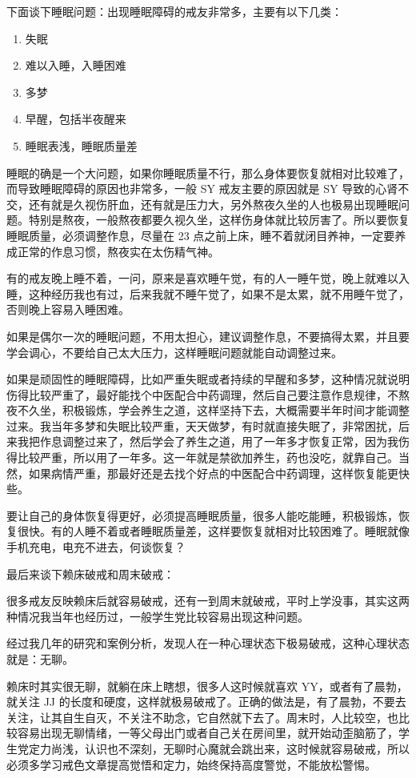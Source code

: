 \documentclass{ctexart}
\begin{document}
下面谈下睡眠问题：出现睡眠障碍的戒友非常多，主要有以下几类：

\begin{enumerate}
    \item 失眠
    \item 难以入睡，入睡困难
    \item 多梦
    \item 早醒，包括半夜醒来
    \item 睡眠表浅，睡眠质量差
\end{enumerate}

睡眠的确是一个大问题，如果你睡眠质量不行，那么身体要恢复就相对比较难了，而导致睡眠障碍的原因也非常多，一般 SY 戒友主要的原因就是 SY 导致的心肾不交，还有就是久视伤肝血，还有就是压力大，另外熬夜久坐的人也极易出现睡眠问题。特别是熬夜，一般熬夜都要久视久坐，这样伤身体就比较厉害了。所以要恢复睡眠质量，必须调整作息，尽量在 23 点之前上床，睡不着就闭目养神，一定要养成正常的作息习惯，熬夜实在太伤精气神。

有的戒友晚上睡不着，一问，原来是喜欢睡午觉，有的人一睡午觉，晚上就难以入睡，这种经历我也有过，后来我就不睡午觉了，如果不是太累，就不用睡午觉了，否则晚上容易入睡困难。

如果是偶尔一次的睡眠问题，不用太担心，建议调整作息，不要搞得太累，并且要学会调心，不要给自己太大压力，这样睡眠问题就能自动调整过来。

如果是顽固性的睡眠障碍，比如严重失眠或者持续的早醒和多梦，这种情况就说明伤得比较严重了，最好能找个中医配合中药调理，然后自己要注意作息规律，不熬夜不久坐，积极锻炼，学会养生之道，这样坚持下去，大概需要半年时间才能调整过来。我当年多梦和失眠比较严重，天天做梦，有时就直接失眠了，非常困扰，后来我把作息调整过来了，然后学会了养生之道，用了一年多才恢复正常，因为我伤得比较严重，所以用了一年多。这一年就是禁欲加养生，药也没吃，就靠自己。当然，如果病情严重，那最好还是去找个好点的中医配合中药调理，这样恢复能更快些。

要让自己的身体恢复得更好，必须提高睡眠质量，很多人能吃能睡，积极锻炼，恢复很快。有的人睡不着或者睡眠质量差，这样要恢复就相对比较困难了。睡眠就像手机充电，电充不进去，何谈恢复？

最后来谈下赖床破戒和周末破戒：

很多戒友反映赖床后就容易破戒，还有一到周末就破戒，平时上学没事，其实这两种情况我当年也经历过，一般学生党比较容易出现这种问题。

经过我几年的研究和案例分析，发现人在一种心理状态下极易破戒，这种心理状态就是：无聊。

赖床时其实很无聊，就躺在床上瞎想，很多人这时候就喜欢 YY，或者有了晨勃，就关注 JJ 的长度和硬度，这样就极易破戒了。正确的做法是，有了晨勃，不要去关注，让其自生自灭，不关注不助念，它自然就下去了。周末时，人比较空，也比较容易出现无聊情绪，一等父母出门或者自己关在房间里，就开始动歪脑筋了，学生党定力尚浅，认识也不深刻，无聊时心魔就会跳出来，这时候就容易破戒，所以必须多学习戒色文章提高觉悟和定力，始终保持高度警觉，不能放松警惕。
\end{document}
